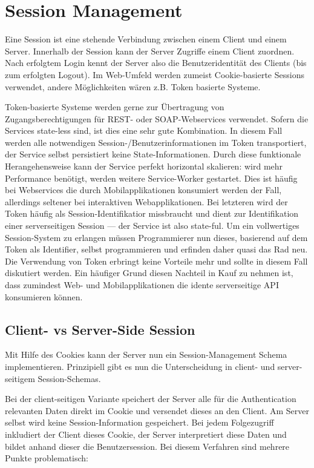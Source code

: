 \chapter{Session Management}

Eine Session ist eine stehende Verbindung zwischen einem Client und einem Server. Innerhalb der Session kann der Server Zugriffe einem Client zuordnen. Nach erfolgtem Login kennt der Server also die Benutzeridentität des Clients (bis zum erfolgten Logout). Im Web-Umfeld werden zumeist Cookie-basierte Sessions verwendet, andere Möglichkeiten wären z.B. Token basierte Systeme.

Token-basierte Systeme werden gerne zur Übertragung von Zugangsberechtigungen für REST- oder SOAP-Webservices verwendet. Sofern die Services state-less sind, ist dies eine sehr gute Kombination. In diesem Fall werden alle notwendigen Session-/Benutzerinformationen im Token transportiert, der Service selbst persistiert keine State-Informationen. Durch diese funktionale Herangehensweise kann der Service perfekt horizontal skalieren: wird mehr Performance benötigt, werden weitere Service-Worker gestartet. Dies ist häufig bei Webservices die durch Mobilapplikationen konsumiert werden der Fall, allerdings seltener bei interaktiven Webapplikationen. Bei letzteren wird der Token häufig als Session-Identifikatior missbraucht und dient zur Identifikation einer serverseitigen Session --- der Service ist also state-ful. Um ein vollwertiges Session-System zu erlangen müssen Programmierer nun dieses, basierend auf dem Token als Identifier, selbst programmieren und erfinden daher quasi das Rad neu. Die Verwendung von Token erbringt keine Vorteile mehr und sollte in diesem Fall diskutiert werden. Ein häufiger Grund diesen Nachteil in Kauf zu nehmen ist, dass zumindest Web- und Mobilapplikationen die idente serverseitige API konsumieren können.

\section{Client- vs Server-Side Session}

Mit Hilfe des Cookies kann der Server nun ein Session-Management Schema implementieren. Prinzipiell gibt es nun die Unterscheidung in client- und server-seitigem Session-Schemas.

Bei der client-seitigen Variante speichert der Server alle für die Authentication relevanten Daten direkt im Cookie und versendet dieses an den Client. Am Server selbst wird keine Session-Information gespeichert. Bei jedem Folgezugriff inkludiert der Client dieses Cookie, der Server interpretiert diese Daten und bildet anhand dieser die Benutzersession. Bei diesem Verfahren sind mehrere Punkte problematisch:

